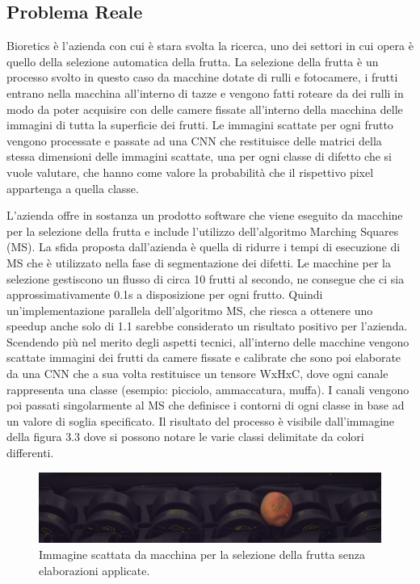 \documentclass[12pt,a4paper]{report}
\begin{document}
\subsection{Problema Reale}
Bioretics è l'azienda con cui è stara svolta la ricerca, uno dei settori in cui opera è quello della selezione automatica della frutta. La selezione della frutta è un processo svolto in questo caso da macchine dotate di rulli e fotocamere, i frutti entrano nella macchina all'interno di tazze e vengono fatti roteare da dei rulli in modo da poter acquisire con delle camere fissate all'interno della macchina delle immagini di tutta la superficie dei frutti. Le immagini scattate per ogni frutto vengono processate e passate ad una CNN che restituisce delle matrici della stessa dimensioni delle immagini scattate, una per ogni classe di difetto che si vuole valutare, che hanno come valore la probabilità che il rispettivo pixel appartenga a quella classe. \newline

L'azienda offre in sostanza un prodotto software che viene eseguito da macchine per la selezione della frutta e include l’utilizzo dell'algoritmo Marching Squares (MS). La sfida proposta dall'azienda è quella di ridurre i tempi di esecuzione di MS che è utilizzato nella fase di segmentazione dei difetti.
Le macchine per la selezione gestiscono un flusso di circa 10 frutti al secondo, ne consegue che ci sia approssimativamente 0.1s a disposizione per ogni frutto. Quindi un’implementazione parallela dell’algoritmo MS, che riesca a ottenere uno speedup anche solo di 1.1 sarebbe considerato un risultato positivo per l’azienda.
Scendendo più nel merito degli aspetti tecnici, all’interno delle macchine vengono scattate immagini dei frutti da camere fissate e calibrate che sono poi elaborate da una CNN che a sua volta restituisce un tensore WxHxC, dove ogni canale rappresenta una classe (esempio: picciolo, ammaccatura, muffa). I canali vengono poi passati singolarmente al MS che definisce i contorni di ogni classe in base ad un valore di soglia specificato. Il risultato del processo è visibile dall’immagine della figura 3.3 dove si possono notare le varie classi delimitate da colori differenti. \newline

\begin{figure}[H]
    \centering
    \includegraphics[scale=0.25]{img/marching_squares_00000052_00000001.png}
    \caption{Immagine scattata da macchina per la selezione della frutta senza elaborazioni applicate.}
\end{figure} 
\end{document}
